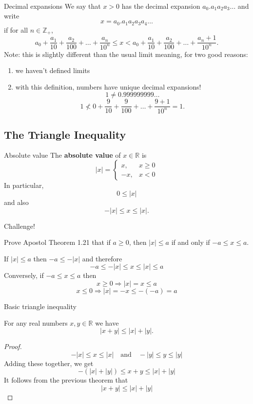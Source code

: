 \documentclass{beamer}
\begin{document}
\begin{frame}{Decimal expansions}
We say that $x>0$ has the decimal expansion $a_0.a_1a_2a_3\dots$ and write
$$x = a_0.a_1a_2a_3a_4\dots$$
\pause
if for all $n\in\mathbb{Z}_+$,
$$a_0 + \frac{a_1}{10} + \frac{a_2}{100} + \dots + \frac{a_n}{10^n}
\leq x < a_0 + \frac{a_1}{10} + \frac{a_2}{100} + \dots + \frac{a_n+1}{10^n}.
$$
\pause
Note: this is slightly different than the usual limit meaning, for two good reasons:
\begin{enumerate}
\pause
\item we haven't defined limits
\pause
\item with this definition, numbers have unique decimal expansions!
\pause
$$1\neq 0.999999999\dots$$
\pause
$$1 \nless 0 + \frac{9}{10} + \frac{9}{100} + \dots + \frac{9+1}{10^n} = 1.$$
\end{enumerate}
\end{frame}

\subsection{The Triangle Inequality}

\begin{frame}{Absolute value}
The \textbf{absolute value} of $x\in \mathbb{R}$ is
$$\lvert x \rvert = \left\lbrace\begin{array}{cc}
 x,& x \geq 0\\
-x,& x < 0
\end{array}\right.$$
In particular,
$$0\leq \lvert x\rvert$$
and also
$$-\lvert x\rvert\leq x \leq \lvert x\rvert.$$
\end{frame}

\begin{frame}{Challenge!}
\begin{prob}
Prove Apostol Theorem 1.21 that if $a\geq 0$, then $\lvert x\rvert \leq a$ if and only if $-a\leq x\leq a$.
\end{prob}
\pause 
\begin{soln}
If $\lvert x\rvert \leq a$ then $-a\leq -\lvert x\rvert$
\pause 
and therefore
$$-a\leq -\lvert x\rvert \leq x\leq \lvert x\rvert\leq a$$
\pause 
Conversely, if $-a\leq x\leq a$ then
\pause 
$$x\geq 0\Rightarrow \lvert x\rvert = x\leq a$$
\pause 
$$x\leq 0\Rightarrow \lvert x\rvert = -x\leq -(-a) = a$$
\end{soln}
\end{frame}

\begin{frame}{Basic triangle inequality}
\begin{thm}
For any real numbers $x,y\in\mathbb{R}$ we have
$$\lvert x+y\rvert\leq \lvert x \rvert + \lvert y\rvert.$$
\end{thm}
\pause 
\begin{proof}
$$
-\lvert x \rvert \leq x\leq \lvert x\rvert
\quad\text{and}\quad
-\lvert y \rvert \leq y\leq \lvert y\rvert
$$
\pause
Adding these together, we get
$$
-(\lvert x \rvert + \lvert y \rvert) \leq x + y\leq \lvert x\rvert + \lvert y\rvert
$$
\pause
It follows from the previous theorem that
$$\lvert x + y\rvert \leq \lvert x\rvert + \lvert y\rvert$$
\end{proof}
\end{frame}
\end{document}
